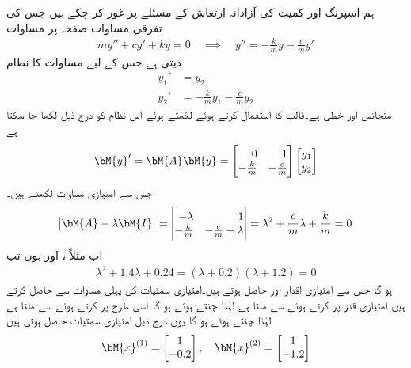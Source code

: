 ہم  اسپرنگ اور کمیت کی آزادانہ ارتعاش  کے مسئلے پر غور کر چکے ہیں جس کی تفرقی مساوات صفحہ  پر مساوات 
\begin{align}
my''+cy'+ky=0 \quad \implies \quad y''=-\frac{k}{m}y-\frac{c}{m}y'
\end{align}
 دیتی ہے جس کے لیے مساوات  کا نظام
\begin{align*}
y_1'&=y_2\\
y_2'&=-\frac{k}{m}y_1-\frac{c}{m}y_2
\end{align*}
 متجانس اور خطی ہے۔قالب کا استعمال کرتے ہوئے  لکھتے ہوئے اس نظام کو درج ذیل لکھا جا سکتا ہے
\begin{align}
\bM{y}'=\bM{A}\bM{y}=\begin{bmatrix*}[r] 0 & 1 \\ -\frac{k}{m}& -\frac{c}{m} \end{bmatrix*}\begin{bmatrix*}[r]  y_1 \\ y_2 \end{bmatrix*}
\end{align}
جس سے امتیازی مساوات لکھتے ہیں۔
\begin{align*}
\abs{\bM{A}-\lambda \bM{I}}=\begin{vmatrix*}[r] -\lambda & 1\\ -\frac{k}{m}& -\frac{c}{m}-\lambda \end{vmatrix*}=\lambda^2+\frac{c}{m}\lambda+\frac{k}{m}=0
\end{align*}
اب مثلاً ،  اور  ہوں تب 
\begin{align*}
\lambda^2+1.4\lambda+0.24=(\lambda+0.2)(\lambda+1.2)=0
\end{align*}
ہو گا جس سے امتیازی اقدار  اور  حاصل ہوتے ہیں۔امتیازی سمتیات  کی پہلی مساوات  سے حاصل کرتے ہیں۔امتیازی قدر  پر کرتے ہوئے   سے  ملتا ہے لہٰذا  چنتے ہوئے  ہو گا۔اسی طرح  پر کرتے ہوئے  سے  ملتا ہے لہٰذا  چنتے ہوئے  ہو گا۔یوں درج ذیل امتیازی سمتیات حاصل ہوتی ہیں
\begin{align*}
\bM{x}^{(1)}=\begin{bmatrix*} 1 \\ -0.2  \end{bmatrix*}, \quad \bM{x}^{(2)}=\begin{bmatrix*}  1 \\ -1.2 \end{bmatrix*}
\end{align*}
